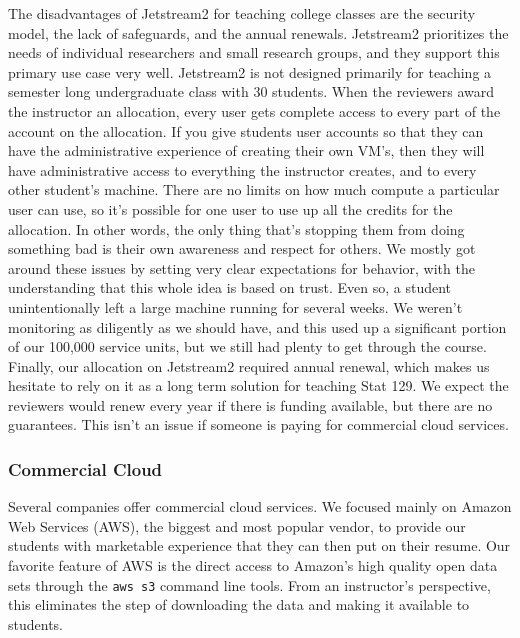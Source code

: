 \documentclass[12pt]{article}
\begin{document}
The disadvantages of Jetstream2 for teaching college classes are the security model, the lack of safeguards, and the annual renewals.
Jetstream2 prioritizes the needs of individual researchers and small research groups, and they support this primary use case very well.
Jetstream2 is not designed primarily for teaching a semester long undergraduate class with 30 students.
When the reviewers award the instructor an allocation, every user gets complete access to every part of the account on the allocation.
If you give students user accounts so that they can have the administrative experience of creating their own VM's, then they will have administrative access to everything the instructor creates, and to every other student's machine.
There are no limits on how much compute a particular user can use, so it's possible for one user to use up all the credits for the allocation.
In other words, the only thing that's stopping them from doing something bad is their own awareness and respect for others.
We mostly got around these issues by setting very clear expectations for behavior, with the understanding that this whole idea is based on trust.
Even so, a student unintentionally left a large machine running for several weeks.
We weren't monitoring as diligently as we should have, and this used up a significant portion of our 100,000 service units, but we still had plenty to get through the course.
Finally, our allocation on Jetstream2 required annual renewal, which makes us hesitate to rely on it as a long term solution for teaching Stat 129.
We expect the reviewers would renew every year if there is funding available, but there are no guarantees.
This isn't an issue if someone is paying for commercial cloud services.


\subsubsection{Commercial Cloud}
\label{sec:comcloud}

Several companies offer commercial cloud services.
We focused mainly on Amazon Web Services (AWS), the biggest and most popular vendor, to provide our students with marketable experience that they can then put on their resume.
Our favorite feature of AWS is the direct access to Amazon's high quality open data sets through the \texttt{aws s3} command line tools.
From an instructor's perspective, this eliminates the step of downloading the data and making it available to students.
\end{document}
